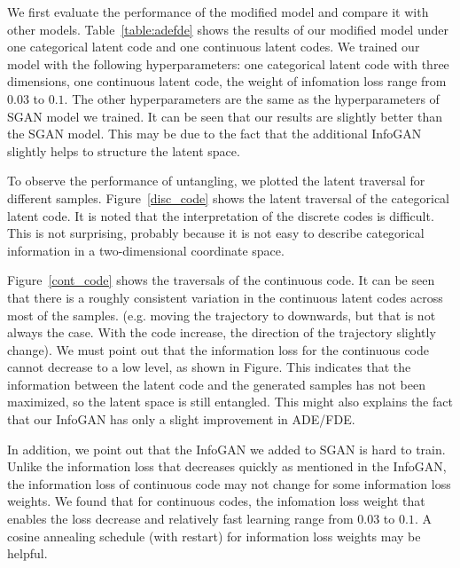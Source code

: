 We first evaluate the performance of the modified model and compare it with other models. Table~\ref{table:adefde} shows the results of our modified model under one categorical latent code and one continuous latent codes. We trained our model with the following hyperparameters: one categorical latent code with three dimensions, one continuous latent code, the weight of infomation loss range from $0.03$ to $0.1$. The other hyperparameters are the same as the hyperparameters of SGAN model we trained. It can be seen that our results are slightly better than the SGAN model. This may be due to the fact that the additional InfoGAN slightly helps to structure the latent space.

To observe the performance of untangling, we plotted the latent traversal for different samples. Figure~\ref{disc_code} shows the latent traversal of the categorical latent code. It is noted that the interpretation of the discrete codes is difficult. This is not surprising, probably because it is not easy to describe categorical information in a two-dimensional coordinate space.

Figure~\ref{cont_code} shows the traversals of the continuous code. It can be seen that there is a roughly consistent variation in the continuous latent codes across most of the samples. (e.g. moving the trajectory to downwards, but that is not always the case. With the code increase, the direction of the trajectory slightly change). We must point out that the information loss for the continuous code cannot decrease to a low level, as shown in Figure. This indicates that the information between the latent code and the generated samples has not been maximized, so the latent space is still entangled. This might also explains the fact that our InfoGAN has only a slight improvement in ADE/FDE.


In addition, we point out that the InfoGAN we added to SGAN is hard to train. Unlike the information loss that decreases quickly as mentioned in the InfoGAN, the information loss of continuous code may not change for some information loss weights. We found that for continuous codes, the infomation loss weight that enables the loss decrease and relatively fast learning  range from $0.03$ to $0.1$. A cosine annealing schedule (with restart) for information loss weights may be helpful.

